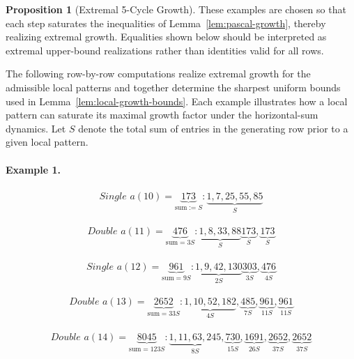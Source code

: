 \documentclass[12pt, oneside]{article}
\numberwithin{equation}{section}
\theoremstyle{definition}
\newtheorem{proposition}{Proposition}[section]
\theoremstyle{plain}
\theoremstyle{remark}
\begin{document}
\begin{proposition}[Extremal 5-Cycle Growth]

These examples are chosen so that each step saturates the inequalities of
Lemma~\ref{lem:pascal-growth}, thereby realizing extremal growth. Equalities
shown below should be interpreted as extremal upper-bound realizations rather than
identities valid for all rows.

The following row-by-row computations realize extremal growth for the admissible
local patterns and together determine the sharpest uniform bounds used in
Lemma~\ref{lem:local-growth-bounds}.  Each example illustrates how a local pattern
can saturate its maximal growth factor under the horizontal-sum dynamics.  Let $S$
denote the total sum of entries in the generating row prior to a given local pattern.

\paragraph{Example 1.}
\[
\begin{array}{l}
\textit{Single } a(10) = \underbrace{173}_{\text{sum} := S}:
\underbrace{1,7,25,55,85}_{S}
\end{array}
\]

\[
\begin{array}{l}
\textit{Double } a(11) = \underbrace{476}_{\text{sum} = 3S}:
\underbrace{1,8,33,88}_{S}
\underbrace{173}_{S},
\underbrace{173}_{S}
\end{array}
\]

\[
\begin{array}{l}
\textit{Single } a(12) = \underbrace{961}_{\text{sum} = 9S}:
\underbrace{1,9,42,130}_{2S}
\underbrace{303}_{3S},
\underbrace{476}_{4S}
\end{array}
\]

\[
\begin{array}{l}
\textit{Double } a(13) = \underbrace{2652}_{\text{sum} = 33S}:
\underbrace{1,10,52,182}_{4S},
\underbrace{485}_{7S},
\underbrace{961}_{11S},
\underbrace{961}_{11S}
\end{array}
\]

\[
\begin{array}{l}
\textit{Double } a(14) = \underbrace{8045}_{\text{sum} = 123S}:
\underbrace{1,11,63,245}_{8S},
\underbrace{730}_{15S},
\underbrace{1691}_{26S},
\underbrace{2652}_{37S},
\underbrace{2652}_{37S}
\end{array}
\]


\end{proposition}
\end{document}
